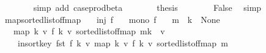\begin{isabellebody}
\ \ \ \ \ \ \isamarkupfalse%
\ {\isacharparenleft}{\kern0pt}simp\ add{\isacharcolon}{\kern0pt}\ case{\isacharunderscore}{\kern0pt}prod{\isacharunderscore}{\kern0pt}beta{\isacharparenright}{\kern0pt}\isanewline
\ \ \ \ \isamarkupfalse%
\ \isamarkupfalse%
\ {\isacharquery}{\kern0pt}thesis\isanewline
\ \ \ \ \ \ \isamarkupfalse%
\ False\ \isamarkupfalse%
\ simp\isanewline
\ \ \isamarkupfalse%
\isanewline
{}\isamarkupfalse%
%
\endisatagproof
{\isafoldproof}%
%
\isadelimproof
\isanewline
%
\endisadelimproof
\isanewline
{}\isamarkupfalse%
\ map{\isacharunderscore}{\kern0pt}sorted{\isacharunderscore}{\kern0pt}list{\isacharunderscore}{\kern0pt}of{\isacharunderscore}{\kern0pt}fmap{\isacharcolon}{\kern0pt}\isanewline
\ \ \ {\isachardoublequoteopen}inj\ f{\isachardoublequoteclose}\isanewline
\ \ \ {\isachardoublequoteopen}mono\ f{\isachardoublequoteclose}\isanewline
\ \ \ {\isachardoublequoteopen}m\ {\isachardollar}{\kern0pt}{\isachardollar}{\kern0pt}\ k\ {\isacharequal}{\kern0pt}\ None{\isachardoublequoteclose}\isanewline
\ \ \ {\isachardoublequoteopen}map\ {\isacharparenleft}{\kern0pt}{\isasymlambda}{\isacharparenleft}{\kern0pt}k{\isacharcomma}{\kern0pt}\ v{\isacharparenright}{\kern0pt}{\isachardot}{\kern0pt}\ {\isacharparenleft}{\kern0pt}f\ k{\isacharcomma}{\kern0pt}\ v{\isacharparenright}{\kern0pt}{\isacharparenright}{\kern0pt}\ {\isacharparenleft}{\kern0pt}sorted{\isacharunderscore}{\kern0pt}list{\isacharunderscore}{\kern0pt}of{\isacharunderscore}{\kern0pt}fmap\ {\isacharparenleft}{\kern0pt}m{\isacharparenleft}{\kern0pt}k\ {\isachardollar}{\kern0pt}{\isachardollar}{\kern0pt}{\isacharcolon}{\kern0pt}{\isacharequal}{\kern0pt}\ v{\isacharparenright}{\kern0pt}{\isacharparenright}{\kern0pt}{\isacharparenright}{\kern0pt}\ {\isacharequal}{\kern0pt}\isanewline
\ \ \ \ insort{\isacharunderscore}{\kern0pt}key\ fst\ {\isacharparenleft}{\kern0pt}f\ k{\isacharcomma}{\kern0pt}\ v{\isacharparenright}{\kern0pt}\ {\isacharparenleft}{\kern0pt}map\ {\isacharparenleft}{\kern0pt}{\isasymlambda}{\isacharparenleft}{\kern0pt}k{\isacharcomma}{\kern0pt}\ v{\isacharparenright}{\kern0pt}{\isachardot}{\kern0pt}\ {\isacharparenleft}{\kern0pt}f\ k{\isacharcomma}{\kern0pt}\ v{\isacharparenright}{\kern0pt}{\isacharparenright}{\kern0pt}\ {\isacharparenleft}{\kern0pt}sorted{\isacharunderscore}{\kern0pt}list{\isacharunderscore}{\kern0pt}of{\isacharunderscore}{\kern0pt}fmap\ m{\isacharparenright}{\kern0pt}{\isacharparenright}{\kern0pt}{\isachardoublequoteclose}\isanewline

\end{isabellebody}
